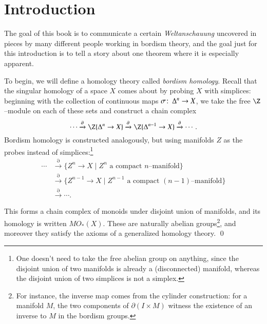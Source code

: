 
\setcounter{chapter}{-1}
\chapter{Introduction}

\label{IntroductionSection}

The goal of this book is to communicate a certain \textit{Weltanschauung} uncovered in pieces by many different people working in bordism theory, and the goal just for this introduction is to tell a story about one theorem where it is especially apparent.

To begin, we will define a homology theory called \textit{bordism homology}.  Recall that the singular homology of a space $X$ comes about by probing $X$ with simplices: beginning with the collection of continuous maps $\sigma\colon\thinspace \Delta^n \to X$, we take the free $\Z$--module on each of these sets and construct a chain complex \[\cdots \xrightarrow{\partial} \Z\{\Delta^n \to X\} \xrightarrow{\partial} \Z\{\Delta^{n-1} \to X\} \xrightarrow{\partial} \cdots.\]  Bordism homology is constructed analogously, but using manifolds $Z$ as the probes instead of simplices:\footnote{One doesn't need to take the free abelian group on anything, since the disjoint union of two manifolds is already a (disconnected) manifold, whereas the disjoint union of two simplices is not a simplex.}
\begin{align*}
\cdots & \xrightarrow{\partial} \{Z^n \to X \mid \text{$Z^n$ a compact $n$--manifold}\} \\
& \xrightarrow{\partial} \{Z^{n-1} \to X \mid \text{$Z^{n-1}$ a compact $(n-1)$--manifold}\} \\
& \xrightarrow{\partial} \cdots.
\end{align*}

\begin{lemma}\label{OriginalDefnOfBordism}
This forms a chain complex of monoids under disjoint union of manifolds, and its homology is written $MO_*(X)$.  These are naturally abelian groups\footnote{For instance, the inverse map comes from the cylinder construction: for a manifold $M$, the two components of $\partial(I \times M)$ witness the existence of an inverse to $M$ in the bordism groups.}, and moreover they satisfy the axioms of a generalized homology theory. \qed
\end{lemma}

